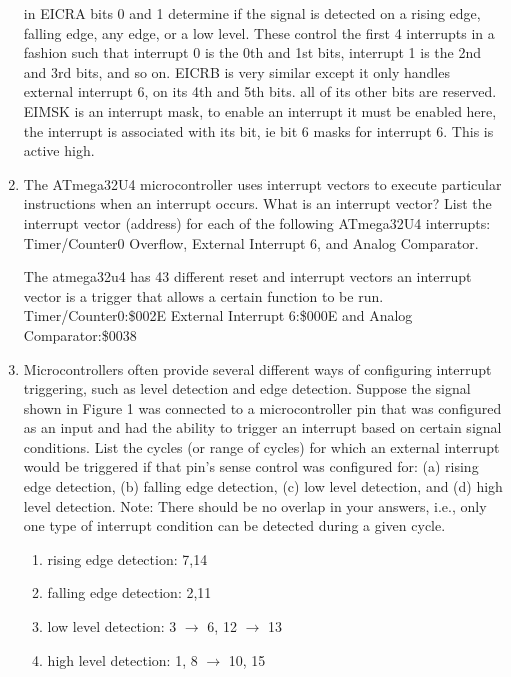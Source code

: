 \documentclass[12pt,letterpaper]{article}
\begin{document}
\begin{enumerate}
	in EICRA bits 0 and 1 determine if the signal is detected on a rising edge, falling edge, any edge, or a low level. These control the first 4 interrupts in a fashion such that interrupt 0 is the 0th and 1st bits, interrupt 1 is the 2nd and 3rd bits, and so on. EICRB is very similar except it only handles external interrupt 6, on its 4th and 5th bits. all of its other bits are reserved. EIMSK is an interrupt mask, to enable an interrupt it must be enabled here, the interrupt is associated with its bit, ie bit 6 masks for interrupt 6. This is active high.
	
	
    
	\item 
	The ATmega32U4 microcontroller uses interrupt vectors to execute particular instructions when an interrupt occurs. What is an interrupt vector? List the interrupt vector (address) for each of the following ATmega32U4 interrupts: Timer/Counter0 Overflow, External Interrupt 6, and Analog Comparator.
	
	The atmega32u4 has 43 different reset and interrupt vectors an interrupt vector is a trigger that allows a certain function to be run. Timer/Counter0:\$002E External Interrupt 6:\$000E and Analog Comparator:\$0038
	
	
	\item 
	Microcontrollers often provide several different ways of configuring interrupt triggering, such as level detection and edge detection. Suppose the signal shown in Figure 1 was connected to a microcontroller pin that was configured as an input and had the ability to trigger an interrupt based on certain signal conditions. List the cycles (or range of cycles) for which an external interrupt would be triggered if that pin’s sense control was configured for: (a) rising edge detection, (b) falling edge detection, (c) low level detection, and (d) high level detection. Note: There should be no overlap in your answers, i.e., only one type of interrupt condition can be detected during a given cycle.
	
	\begin{enumerate}
		\item 
		rising edge detection: 7,14
		
		\item 
		falling edge detection: 2,11
		
		
		\item 
		low level detection: 3 $\rightarrow$ 6, 12 $\rightarrow$ 13
		
		\item
		high level detection: 1, 8 $\rightarrow$ 10, 15
	\end{enumerate}
	

\end{enumerate}
\end{document}

